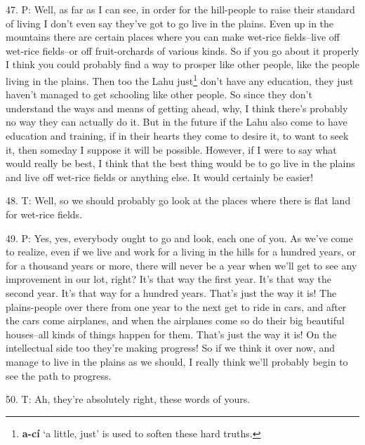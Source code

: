 47. P: Well, as far as I can see, in order for the hill-people to raise their standard
of living I don't even say they've got to go live in the plains. Even up in the
mountains there are certain places where you can make wet-rice fields--live off
wet-rice fields--or off fruit-orchards of various kinds. So if you go about it
properly I think you could probably find a way to prosper like other people, like
the people living in the plains. Then too the Lahu just\footnote{\textbf{a-cí} `a little, just' is used to soften these hard truths.} don't have any education,
they just haven't managed to get schooling like other people. So since they don't
understand the ways and means of getting ahead, why, I think there's probably no
way they can actually do it. But in the future if the Lahu also come to have education
and training, if in their hearts they come to desire it, to want to seek it, then
someday I suppose it will be possible. However, if I were to say what would really
be best, I think that the best thing would be to go live in the plains and live
off wet-rice fields or anything else. It would certainly be easier!

48. T: Well, so we should probably go look at the places where there is flat land
for wet-rice fields.

49. P: Yes, yes, everybody ought to go and look, each one of you. As we've come
to realize, even if we live and work for a living in the hills for a hundred years,
or for a thousand years or more, there will never be a year when we'll get to see
any improvement in our lot, right? It's that way the first year. It's that way
the second year. It's that way for a hundred years. That's just the way it is!
The plains-people over there from one year to the next get to ride in cars, and
after the cars come airplanes, and when the airplanes come so do their big beautiful
houses--all kinds of things happen for them. That's just the way it is! On the
intellectual side too they're making progress! So if we think it over now, and
manage to live in the plains as we should, I really think we'll probably begin
to see the path to progress.

50. T: Ah, they're absolutely right, these words of yours.

